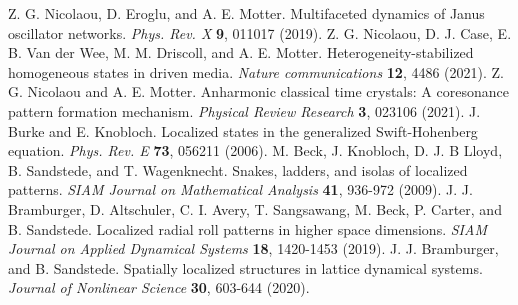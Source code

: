 \documentclass[aps,pre,amsmath,amssymb,floatfix,onecolumn,notitlepage,10pt]{revtex4-1}
\begin{document}
\begin{thebibliography}{99}
 Z. G. Nicolaou, D. Eroglu, and A. E. Motter. Multifaceted dynamics of Janus oscillator networks. \textit{Phys. Rev. X} \textbf{9}, 011017 (2019).
 Z. G. Nicolaou, D. J. Case, E. B. Van der Wee, M. M. Driscoll, and A. E. Motter. Heterogeneity-stabilized homogeneous states in driven media. \textit{Nature communications} \textbf{12}, 4486 (2021).
 Z. G. Nicolaou and A. E. Motter. Anharmonic classical time crystals: A coresonance pattern formation mechanism. \textit{Physical Review Research} \textbf{3}, 023106 (2021).
 J. Burke and E. Knobloch. Localized states in the generalized Swift-Hohenberg equation. \textit{Phys. Rev. E} \textbf{73}, 056211 (2006).
 M. Beck, J. Knobloch, D. J. B Lloyd, B. Sandstede, and T. Wagenknecht. Snakes, ladders, and isolas of localized patterns. \textit{SIAM Journal on Mathematical Analysis} \textbf{41}, 936-972 (2009).
J. J. Bramburger, D. Altschuler, C. I. Avery, T. Sangsawang, M. Beck, P. Carter, and B. Sandstede. Localized radial roll patterns in higher space dimensions. \textit{SIAM Journal on Applied Dynamical Systems} \textbf{18}, 1420-1453 (2019).
J. J. Bramburger, and B. Sandstede. Spatially localized structures in lattice dynamical systems. \textit{Journal of Nonlinear Science} \textbf{30}, 603-644 (2020).
\end{thebibliography}
\end{document}
